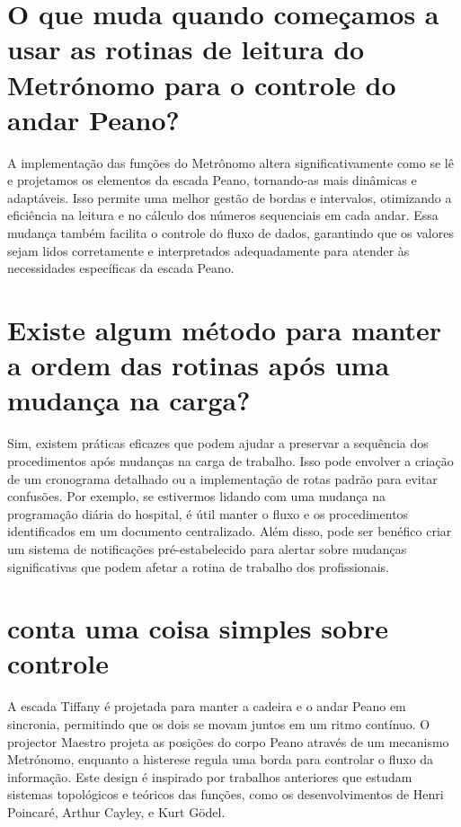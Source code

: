 \documentclass[11pt,a4paper]{article}
\begin{document}
\section{O que muda quando começamos a usar as rotinas de leitura do Metrónomo para o controle do andar Peano?}
A implementação das funções do Metrônomo altera significativamente como se lê e projetamos os elementos da escada Peano, tornando-as mais dinâmicas e adaptáveis. Isso permite uma melhor gestão de bordas e intervalos, otimizando a eficiência na leitura e no cálculo dos números sequenciais em cada andar. Essa mudança também facilita o controle do fluxo de dados, garantindo que os valores sejam lidos corretamente e interpretados adequadamente para atender às necessidades específicas da escada Peano.

\section{Existe algum método para manter a ordem das rotinas após uma mudança na carga?}
Sim, existem práticas eficazes que podem ajudar a preservar a sequência dos procedimentos após mudanças na carga de trabalho. Isso pode envolver a criação de um cronograma detalhado ou a implementação de rotas padrão para evitar confusões. Por exemplo, se estivermos lidando com uma mudança na programação diária do hospital, é útil manter o fluxo e os procedimentos identificados em um documento centralizado. Além disso, pode ser benéfico criar um sistema de notificações pré-estabelecido para alertar sobre mudanças significativas que podem afetar a rotina de trabalho dos profissionais.

\section{conta uma coisa simples sobre controle}
A escada Tiffany é projetada para manter a cadeira e o andar Peano em sincronia, permitindo que os dois se movam juntos em um ritmo contínuo. O projector Maestro projeta as posições do corpo Peano através de um mecanismo Metrónomo, enquanto a histerese regula uma borda para controlar o fluxo da informação. Este design é inspirado por trabalhos anteriores que estudam sistemas topológicos e teóricos das funções, como os desenvolvimentos de Henri Poincaré, Arthur Cayley, e Kurt Gödel.
\end{document}
